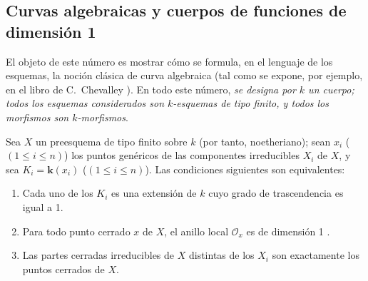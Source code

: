 \documentclass[oneside,10pt]{amsart}
\renewcommand{\leq}{\leqslant}
\newcommand{\oldpage}[2][]{\marginnote{\normalfont\footnotesize\textbf{#1}~|~#2}\ignorespaces}
\let\EGAOriginalLabel\label
\renewcommand{\label}[1]{\phantomsection\EGAOriginalLabel{#1}}
\begin{document}
\oldpage[II]{148}

\subsection{Curvas algebraicas y cuerpos de funciones de dimensión 1}
\label{subsection:II.7.4-fr}

El objeto de este número es mostrar cómo se formula, en el lenguaje de los esquemas, la noción clásica de curva algebraica (tal como se expone, por ejemplo, en el libro de C.~Chevalley \cite{II-23}).
En todo este número, \emph{se designa por $k$ un cuerpo; todos los esquemas considerados son $k$-esquemas de tipo finito, y todos los morfismos son $k$-morfismos}.

\begin{proposition}[7.4.1]
\label{II.7.4.1-fr}
Sea $X$ un preesquema de tipo finito sobre $k$ (por tanto, noetheriano);
sean $x_i$ ($(1\leq i\leq n)$) los puntos genéricos de las componentes irreducibles $X_i$ de $X$, y sea $K_i=\boldsymbol{k}(x_i)$ ($(1\leq i\leq n)$).
Las condiciones siguientes son equivalentes:
\begin{enumerate}
    \item[\rm{(a)}] Cada uno de los $K_i$ es una extensión de $k$ cuyo grado de trascendencia es igual a 1.
    \item[\rm{(b)}] Para todo punto cerrado $x$ de $X$, el anillo local $\mathcal{O}_x$ es de dimensión 1 \textup{}.
    \item[\rm{(c)}] Las partes cerradas irreducibles de $X$ distintas de los $X_i$ son exactamente los puntos cerrados de $X$.
\end{enumerate}
\end{proposition}
\end{document}
